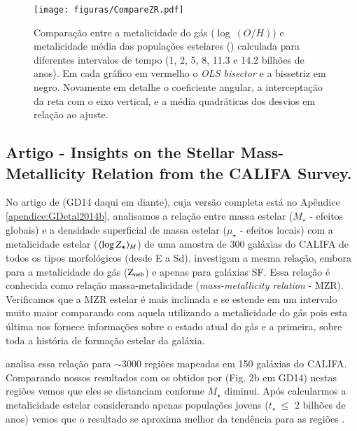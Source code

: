 \begin{figure}
	\centering
	\texttt{[image: figuras/CompareZR.pdf]}
	\caption[ vs. $\log\ (O/H)$ - perfis radiais]
	{Comparação entre a metalicidade do gás ($\log\ (O/H)$) e metalicidade média das populações
estelares () calculada para diferentes intervalos de tempo (1, 2, 5, 8, 11.3 e
14.2 bilhões de anos). Em cada gráfico em vermelho o {\em OLS bisector} e a bissetriz em negro.
Novamente em detalhe o coeficiente angular, a interceptação da reta com o eixo vertical, e a média
quadráticas dos desvios em relação ao ajuste.}
	\label{fig:compareZR}
\end{figure}


\subsection{Artigo - Insights on the Stellar Mass-Metallicity Relation from the CALIFA Survey.}

No artigo de \citet{GonzalezDelgado.etal.2014b} (GD14 daqui em diante), cuja versão completa está no
Apêndice \ref{apendice:GDetal2014b}, analisamos a relação entre massa estelar ($M_\star$ - efeitos
globais) e a densidade superficial de massa estelar ($\mu_\star$ - efeitos locais) com a
metalicidade estelar ($\meanM{\log Z_\star}$) de uma amostra de 300 galáxias do CALIFA de todos os
tipos morfológicos (desde E a Sd). \citet{Tremonti.etal.2004a} investigam a mesma relação, embora
para a metalicidade do gás ($\mathrm{Z}_{\mathrm{neb}}$) e apenas para galáxias SF. Essa relação é conhecida como relação
massa-metalicidade ({\em mass-metallicity relation} - MZR). Verificamos que a MZR estelar é mais
inclinada e se estende em um intervalo muito maior comparando com aquela utilizando a metalicidade
do gás pois esta última nos fornece informações sobre o estado atual do gás e a primeira, sobre toda
a história de formação estelar da galáxia.

\citet{Sanchez.etal.2013a} analisa essa relação para $\sim 3000$ regiões \Hii mapeadas em 150
galáxias do CALIFA. Comparando nossos resultados com os obtidos por \citeauthor{Sanchez.etal.2013a}
(Fig. 2b em GD14) nestas regiões vemos que eles se distanciam conforme $M_\star$ diminui.
Após calcularmos a metalicidade estelar considerando apenas populações jovens ($t_\star\ \leq$ 2
bilhões de anos) vemos que o resultado se aproxima melhor da tendência para as regiões \Hii.

